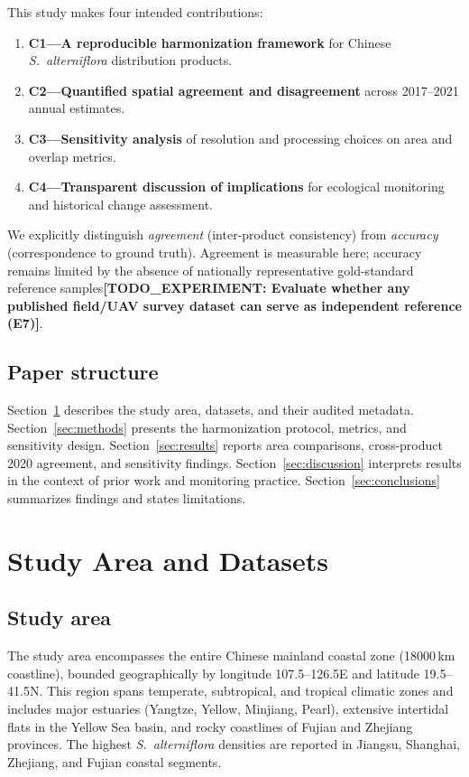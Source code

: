 \documentclass[11pt]{article}
\newcommand{\TODOEXP}[1]{\textcolor{todocolor}{\textbf{[TODO_EXPERIMENT: #1]}}}
\begin{document}
This study makes four intended contributions:

\begin{enumerate}[nosep]
\item \textbf{C1---A reproducible harmonization framework} for Chinese
  \textit{S.~alterniflora} distribution products.
\item \textbf{C2---Quantified spatial agreement and disagreement} across
  2017--2021 annual estimates.
\item \textbf{C3---Sensitivity analysis} of resolution and processing choices on
  area and overlap metrics.
\item \textbf{C4---Transparent discussion of implications} for ecological
  monitoring and historical change assessment.
\end{enumerate}

We explicitly distinguish \textit{agreement} (inter-product consistency) from
\textit{accuracy} (correspondence to ground truth). Agreement is measurable here;
accuracy remains limited by the absence of nationally representative gold-standard
reference samples\TODOEXP{Evaluate whether any published field/UAV survey dataset
can serve as independent reference (E7)}.

\subsection{Paper structure}

Section~\ref{sec:study-area} describes the study area, datasets, and their
audited metadata. Section~\ref{sec:methods} presents the harmonization protocol,
metrics, and sensitivity design. Section~\ref{sec:results} reports area
comparisons, cross-product 2020 agreement, and sensitivity findings.
Section~\ref{sec:discussion} interprets results in the context of prior work
and monitoring practice. Section~\ref{sec:conclusions} summarizes findings and
states limitations.

\section{Study Area and Datasets}
\label{sec:study-area}

\subsection{Study area}

The study area encompasses the entire Chinese mainland coastal zone
(18000\,km coastline), bounded geographically by longitude
107.5\textdegree{}--126.5\textdegree{}E and latitude 19.5\textdegree{}--41.5\textdegree{}N.
This region spans temperate, subtropical, and tropical climatic zones and
includes major estuaries (Yangtze, Yellow, Minjiang, Pearl), extensive
intertidal flats in the Yellow Sea basin, and rocky coastlines of Fujian and
Zhejiang provinces. The highest \textit{S.~alterniflora} densities are reported
in Jiangsu, Shanghai, Zhejiang, and Fujian coastal segments.
\end{document}
